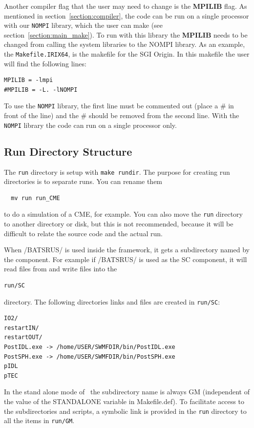 Another compiler flag that the user may need to change is the {\bf MPILIB}
flag.  As mentioned in section~\ref{section:compiler}, the code can be
run on a single processor with our {\tt NOMPI} library, which the user
can make (see section~\ref{section:main_make}).  To run with this library the
{\bf MPILIB} needs to be changed from calling the system libraries to 
the NOMPI library.  As an example, the {\tt Makefile.IRIX64}, is the makefile
for the SGI Origin.  In this makefile the user will find the following lines:
\begin{verbatim}
MPILIB = -lmpi
#MPILIB = -L. -lNOMPI
\end{verbatim}
To use the {\tt NOMPI} library, the first line must be commented out (place a 
\# in front of the line) and the \# should be removed from the second line.
With the {\tt NOMPI} library the code can run on a single processor only.

\subsection{Run Directory Structure \label{section:run_dir}}

The {\tt run} directory is setup with {\tt make rundir}.
The purpose for creating run directories is to separate runs.  
You can rename them
\begin{verbatim}
  mv run run_CME
\end{verbatim}
to do a simulation of a CME, for example.  
You can also move the {\tt run} directory to another
directory or disk, but this is not recommended,
because it will be difficult to relate the source code
and the actual run.

When /BATSRUS/ is used inside the framework, it gets a
subdirectory named by the component. For example
if /BATSRUS/ is used as the SC component, it 
will read files from and write files into the
\begin{verbatim}
run/SC
\end{verbatim}
directory. The following directories links and files 
are created in {\tt run/SC}:
\begin{verbatim}
IO2/
restartIN/
restartOUT/
PostIDL.exe -> /home/USER/SWMFDIR/bin/PostIDL.exe
PostSPH.exe -> /home/USER/SWMFDIR/bin/PostSPH.exe
pIDL
pTEC
\end{verbatim}
In the stand alone mode of \BATSRUS\ the subdirectory name
is always GM (independent of the value of the STANDALONE variable
in Makefile.def). To facilitate access to the subdirectories and
scripts, a symbolic link is provided
in the {\tt run} directory to all the items in {\tt run/GM}.

